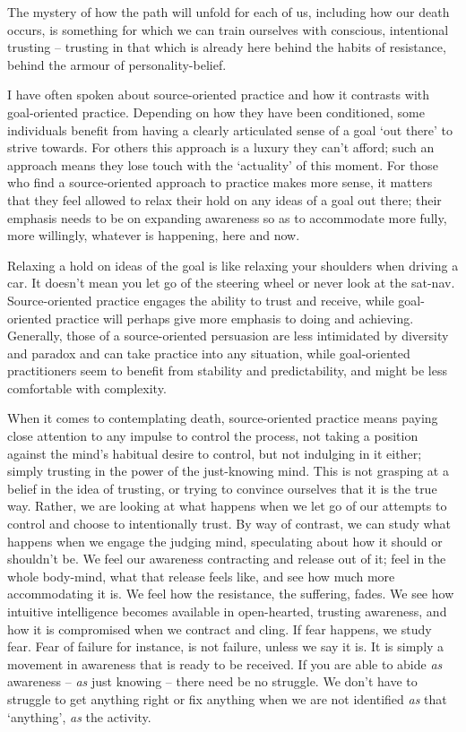 The mystery of how the path will unfold for each of us, including how
our death occurs, is something for which we can train ourselves with
conscious, intentional trusting – trusting in that which is already here
behind the habits of resistance, behind the armour of
personality-belief.

I have often spoken about source-oriented practice and how it contrasts
with goal-oriented practice. Depending on how they have been
conditioned, some individuals benefit from having a clearly articulated
sense of a goal ‘out there’ to strive towards. For others this approach
is a luxury they can’t afford; such an approach means they lose touch
with the ‘actuality’ of this moment. For those who find a
source-oriented approach to practice makes more sense, it matters that
they feel allowed to relax their hold on any ideas of a goal out there;
their emphasis needs to be on expanding awareness so as to accommodate
more fully, more willingly, whatever is happening, here and now.

Relaxing a hold on ideas of the goal is like relaxing your shoulders
when driving a car. It doesn’t mean you let go of the steering wheel or
never look at the sat-nav. Source-oriented practice engages the ability
to trust and receive, while goal-oriented practice will perhaps give
more emphasis to doing and achieving. Generally, those of a
source-oriented persuasion are less intimidated by diversity and paradox
and can take practice into any situation, while goal-oriented
practitioners seem to benefit from stability and predictability, and
might be less comfortable with complexity.

When it comes to contemplating death, source-oriented practice means
paying close attention to any impulse to control the process, not taking
a position against the mind’s habitual desire to control, but not
indulging in it either; simply trusting in the power of the just-knowing
mind. This is not grasping at a belief in the idea of trusting, or
trying to convince ourselves that it is the true way. Rather, we are
looking at what happens when we let go of our attempts to control and
choose to intentionally trust. By way of contrast, we can study what
happens when we engage the judging mind, speculating about how it should
or shouldn’t be. We feel our awareness contracting and release out of
it; feel in the whole body-mind, what that release feels like, and see
how much more accommodating it is. We feel how the resistance, the
suffering, fades. We see how intuitive intelligence becomes available in
open-hearted, trusting awareness, and how it is compromised when we
contract and cling. If fear happens, we study fear. Fear of failure for
instance, is not failure, unless we say it is. It is simply a movement
in awareness that is ready to be received. If you are able to abide \emph{as}
awareness – \emph{as} just knowing – there need be no struggle. We don’t have
to struggle to get anything right or fix anything when we are not
identified \emph{as} that ‘anything’, \emph{as} the activity.


